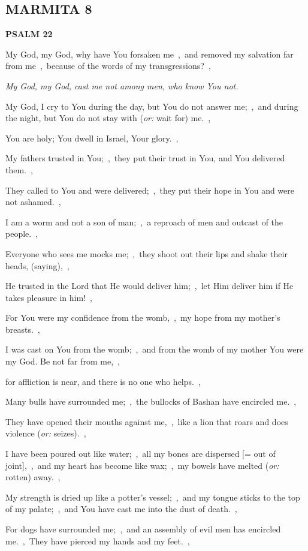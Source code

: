 \documentclass[12pt,twoside,a5paper]{article}
\newcommand{\marmita}[1]{\subsection*{MARMITA {#1}}}
\newcommand{\psalm}[1]{\textbf{PSALM {#1}}\nopagebreak}
\newcommand{\qanona}[1]{{\liturgicalhint{Qanona.} \emph{#1}}}
\newcommand{\translationoption}[1]{\emph{or:} #1}
\begin{document}
\marmita{8}

\psalm{22}

\begin{normalparskip}
  My God, my God, why have You forsaken me~\sep\ and removed my salvation far from me~\sep\ because of the words of my transgressions?~\sep

  \qanona{My God, my God, cast me not among men, who know You not.}

  My God, I cry to You during the day, but You do not answer me;~\sep\ and during the night, but You do not stay with (\translationoption{wait for}) me.~\sep

  You are holy; You dwell in Israel, Your glory.~\sep

  My fathers trusted in You;~\sep\ they put their trust in You, and You delivered them.~\sep

  They called to You and were delivered;~\sep\ they put their hope in You and were not ashamed.~\sep

  I am a worm and not a son of man;~\sep\ a reproach of men and outcast of the people.~\sep

  Everyone who sees me mocks me;~\sep\ they shoot out their lips and shake their heads, (saying),~\sep

  He trusted in the Lord that He would deliver him;~\sep\ let Him deliver him if He takes pleasure in him!~\sep

  For You were my confidence from the womb,~\sep\ my hope from my mother's breasts.~\sep

  I was cast on You from the womb;~\sep\ and from the womb of my mother You were my God. Be not far from me,~\sep

  for affliction is near, and there is no one who helps.~\sep

  Many bulls have surrounded me;~\sep\ the bullocks of Bashan have encircled me.~\sep

  They have opened their mouths against me,~\sep\ like a lion that roars and does violence (\translationoption{seizes}).~\sep

  I have been poured out like water;~\sep\ all my bones are dispersed [= out of joint],~\sep\ and my heart has become like wax;~\sep\ my bowels have melted (\translationoption{rotten}) away.~\sep

  My strength is dried up like a potter's vessel;~\sep\ and my tongue sticks to the top of my palate;~\sep\ and You have cast me into the dust of death.~\sep

  For dogs have surrounded me;~\sep\ and an assembly of evil men has encircled me.~\sep\ They have pierced my hands and my feet.~\sep


\end{normalparskip}
\end{document}
